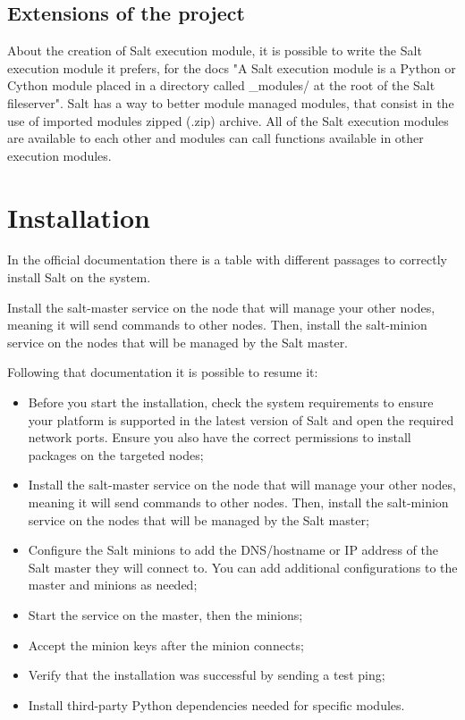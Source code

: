 \documentclass[12pt,a4paper,openright,twoside]{book}
\begin{document}
\subsection{Extensions of the project}
About the creation of Salt execution module, it is possible to write the Salt execution module it prefers,
for the docs "A Salt execution module is a Python or Cython module
placed in a directory called \_modules/ at the root of the Salt fileserver".\cite{saltDocModules}
Salt has a way to better module managed modules, that consist in the use of imported modules zipped (.zip) archive.
All of the Salt execution modules are available to each other and modules can call functions available in other execution modules.

\section{Installation}

In the official documentation\cite{saltDocInstall} there is a table with different passages to correctly install Salt on the system.

Install the salt-master service on the node that will manage your other nodes, meaning it will send commands to other nodes. Then, install the salt-minion service on the nodes that will be managed by the Salt master.

Following that documentation it is possible to resume it:

\begin{itemize}
    \item Before you start the installation, check the system requirements to ensure your platform is supported in the latest version of Salt and open the required network ports. Ensure you also have the correct permissions to install packages on the targeted nodes;
    \item Install the salt-master service on the node that will manage your other nodes, meaning it will send commands to other nodes. Then, install the salt-minion service on the nodes that will be managed by the Salt master;
    \item Configure the Salt minions to add the DNS/hostname or IP address of the Salt master they will connect to. You can add additional configurations to the master and minions as needed;
    \item Start the service on the master, then the minions;
    \item Accept the minion keys after the minion connects;
    \item Verify that the installation was successful by sending a test ping;
    \item Install third-party Python dependencies needed for specific modules.
\end{itemize}
\end{document}
